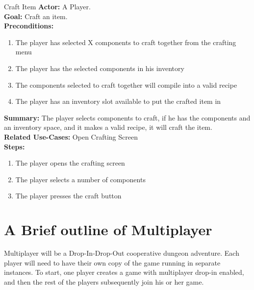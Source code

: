 \documentclass[12pt]{report}
\begin{document}
\begin{subsection}{Craft Item}
\textbf{Actor:} A Player. \\
\textbf{Goal:} Craft an item. \\
\textbf{Preconditions:}
\begin{enumerate}
	\item The player has selected X components to craft together from the crafting menu
	\item The player has the selected components in his inventory
	\item The components selected to craft together will compile into a valid recipe
	\item The player has an inventory slot available to put the crafted item in
\end{enumerate}
\textbf{Summary:} The player selects components to craft, if he has the components and an inventory space, and it makes a valid recipe, it will craft the item. \\
\textbf{Related Use-Cases:} Open Crafting Screen \\
\textbf{Steps:}
\begin{enumerate}
	\item The player opens the crafting screen
	\item The player selects a number of components
	\item The player presses the craft button
\end{enumerate}
\end{subsection}

\chapter{A Brief outline of Multiplayer}
Multiplayer will be a Drop-In-Drop-Out cooperative dungeon adventure. Each player will need to have 
their own copy of the game running in separate instances. To start, one player creates a game with
multiplayer drop-in enabled, and then the rest of the players subsequently join his or her game. 
\end{document}
